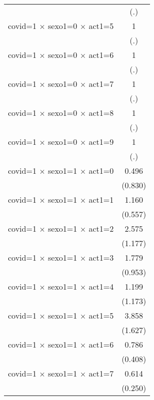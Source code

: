 {\begin{tabular}{l*{1}{c}}
                    &         (.)         \\
[1em]
covid=1 $\times$ sexo1=0 $\times$ act1=5&           1         \\
                    &         (.)         \\
[1em]
covid=1 $\times$ sexo1=0 $\times$ act1=6&           1         \\
                    &         (.)         \\
[1em]
covid=1 $\times$ sexo1=0 $\times$ act1=7&           1         \\
                    &         (.)         \\
[1em]
covid=1 $\times$ sexo1=0 $\times$ act1=8&           1         \\
                    &         (.)         \\
[1em]
covid=1 $\times$ sexo1=0 $\times$ act1=9&           1         \\
                    &         (.)         \\
[1em]
covid=1 $\times$ sexo1=1 $\times$ act1=0&       0.496         \\
                    &     (0.830)         \\
[1em]
covid=1 $\times$ sexo1=1 $\times$ act1=1&       1.160         \\
                    &     (0.557)         \\
[1em]
covid=1 $\times$ sexo1=1 $\times$ act1=2&       2.575\sym{*}  \\
                    &     (1.177)         \\
[1em]
covid=1 $\times$ sexo1=1 $\times$ act1=3&       1.779         \\
                    &     (0.953)         \\
[1em]
covid=1 $\times$ sexo1=1 $\times$ act1=4&       1.199         \\
                    &     (1.173)         \\
[1em]
covid=1 $\times$ sexo1=1 $\times$ act1=5&       3.858\sym{**} \\
                    &     (1.627)         \\
[1em]
covid=1 $\times$ sexo1=1 $\times$ act1=6&       0.786         \\
                    &     (0.408)         \\
[1em]
covid=1 $\times$ sexo1=1 $\times$ act1=7&       0.614         \\
                    &     (0.250)         \\

\end{tabular}}
